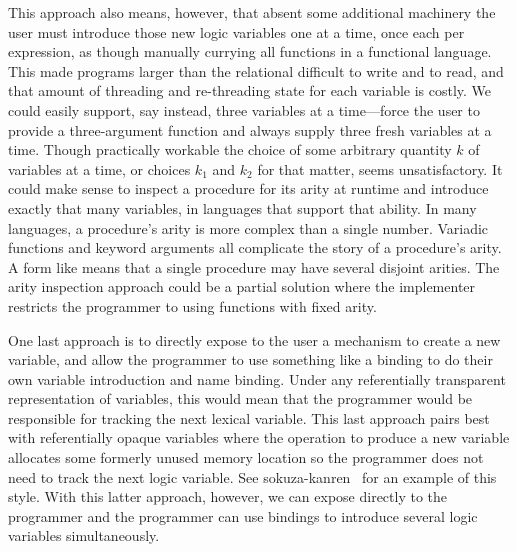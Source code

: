\documentclass[sigplan,balance=true,pbalance=true,natbib=false]{acmart}
\begin{document}
This approach also means, however, that absent some additional
machinery the user must introduce those new logic variables one at a
time, once each per  expression, as though
manually currying all functions in a functional language. This made
programs larger than the relational  difficult to
write and to read, and that amount of threading and re-threading state
for each variable is costly. We could easily support, say instead,
three variables at a time---force the user to provide a three-argument
function and always supply three fresh variables at a time. Though
practically workable the choice of some arbitrary quantity $k$ of
variables at a time, or choices $k_{1}$ and $k_{2}$ for that matter,
seems unsatisfactory. It could make sense to inspect a procedure for
its arity at runtime and introduce exactly that many variables, in
languages that support that ability. In many languages, a procedure's
arity is more complex than a single number. Variadic functions and
keyword arguments all complicate the story of a procedure's arity. A
form like  means that a single procedure may
have several disjoint arities. The arity inspection approach could be
a partial solution where the implementer restricts the programmer to
using functions with fixed arity.

One last approach is to directly expose to the user a mechanism to
create a new variable, and allow the programmer to use something like
a  binding to do their own variable introduction and
name binding. Under any referentially transparent representation of
variables, this would mean that the programmer would be responsible
for tracking the next lexical variable. This last approach pairs best
with referentially opaque variables where the operation to produce a
new variable allocates some formerly unused memory location so the
programmer does not need to track the next logic variable. See
sokuza-kanren~\cite{kiselyov2006taste} for an example of this style.
With this latter approach, however, we can expose 
directly to the programmer and the programmer can use 
bindings to introduce several logic variables simultaneously.

\subsection{}
\end{document}
